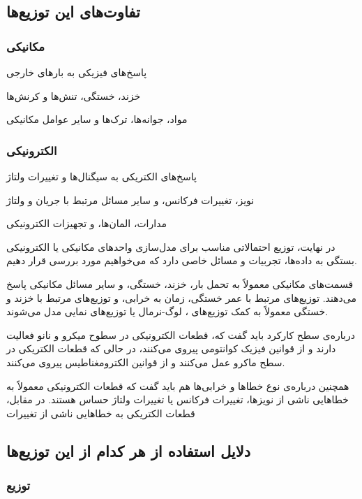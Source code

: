 \subsection*{تفاوت‌های این توزیع‌ها}

\subsubsection*{مکانیکی}

پاسخ‌های فیزیکی به بارهای خارجی

خزند، خستگی، تنش‌ها و کرنش‌ها

مواد، جوانه‌ها، ترک‌ها و سایر عوامل مکانیکی

\subsubsection*{الکترونیکی}

پاسخ‌های الکتریکی به سیگنال‌ها و تغییرات ولتاژ

نویز، تغییرات فرکانس، و سایر مسائل مرتبط با جریان و ولتاژ

مدارات، المان‌ها، و تجهیزات الکترونیکی

در نهایت، توزیع احتمالاتی مناسب برای مدل‌سازی واحدهای مکانیکی یا الکترونیکی بستگی به داده‌ها، تجربیات و مسائل خاصی دارد که می‌خواهیم مورد بررسی قرار دهیم.

قسمت‌های مکانیکی معمولاً به تحمل بار، خزند، خستگی، و سایر مسائل مکانیکی پاسخ می‌دهند.
توزیع‌های مرتبط با عمر خستگی، زمان به خرابی، و توزیع‌های مرتبط با خزند و خستگی معمولاً به کمک توزیع‌های 
، لوگ-نرمال یا توزیع‌های نمایی مدل می‌شوند.

درباره‌ی سطح کارکرد باید گفت که، قطعات الکترونیکی در سطوح میکرو و نانو فعالیت دارند و از قوانین فیزیک کوانتومی پیروی می‌کنند، در حالی که قطعات الکتریکی در سطح ماکرو عمل می‌کنند و از قوانین الکترومغناطیس پیروی می‌کنند.

همچنین درباره‌ی نوع خطاها و خرابی‌ها هم باید گفت که قطعات الکترونیکی معمولاً به خطاهایی ناشی از نویز‌ها، تغییرات فرکانس یا تغییرات ولتاژ حساس هستند. در مقابل، قطعات الکتریکی به خطاهایی ناشی از تغییرات

\subsection*{دلایل استفاده از هر کدام از این توزیع‌ها}

\subsubsection*{توزیع
}


